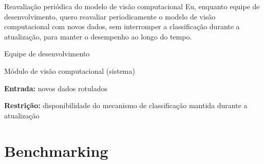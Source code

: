 \documentclass[
    12pt,           %
    oneside,        %
    a4paper,        %
    chapter=TITLE,  %
    english,        %
    brazil          %
]{abntex2}
\begin{document}
{Reavaliação periódica do modelo de visão computacional}
{Eu, enquanto equipe de desenvolvimento, quero reavaliar periodicamente o modelo de visão computacional com novos dados, sem interromper a classificação durante a atualização, para manter o desempenho ao longo do tempo.}
{\begin{dadoslista}
\item Equipe de desenvolvimento
\item Módulo de visão computacional (sistema)
\end{dadoslista}}
{\begin{dadoslista}
\item \textbf{Entrada:} novos dados rotulados
\item \textbf{Restrição:} disponibilidade do mecanismo de classificação mantida durante a atualização
\end{dadoslista}}

\chapter{Benchmarking}
\end{document}
